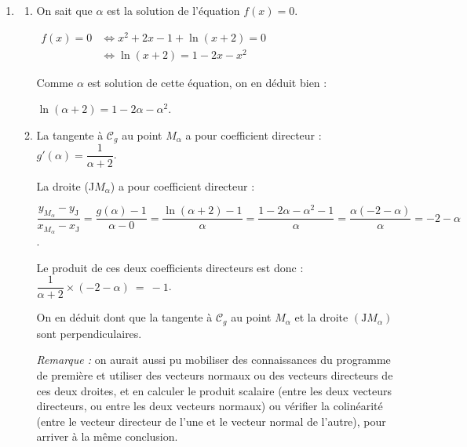\begin{enumerate}
\item \begin{enumerate}
	\item On sait que $\alpha$ est la solution de l'équation $f(x) = 0$.

	$\begin{aligned} f(x) = 0 &\iff x^2 + 2x - 1 + \ln(x+2) = 0\\
	&\iff \ln(x+2) = 1 - 2x -x^2 \end{aligned}$

	Comme $\alpha$ est solution de cette équation, on en déduit bien :

	$\ln (\alpha+2)=1-2 \alpha-\alpha^{2}$.

	\item La tangente à $\mathcal{C}_g$ au point $M_\alpha$ a pour coefficient directeur :\quad $g'(\alpha) = \dfrac{1}{\alpha + 2}$.

	La droite (J$M_\alpha$) a pour coefficient directeur :

	$\dfrac{y_{M_\alpha} - y_\mathrm{J}}{x_{M_\alpha} - x_\mathrm{J}} = \dfrac{g(\alpha) - 1}{\alpha - 0} = \dfrac{\ln(\alpha + 2)-1}{\alpha} = \dfrac{1 - 2\alpha - \alpha^2 - 1}{\alpha} = \dfrac{\alpha (-2 - \alpha)}{\alpha } = -2 - \alpha$.

	Le produit de ces deux coefficients directeurs est donc : \quad $\dfrac{1}{\alpha + 2}\times (-2-\alpha)~=~ -1$.

	On en déduit dont que la tangente à $\mathcal{C}_{g}$ au point $M_{\alpha}$ et la droite $\left(\mathrm{J}M_{\alpha}\right)$ sont perpendiculaires.

	\emph{Remarque :} on aurait aussi pu mobiliser des connaissances du programme de première et utiliser des vecteurs normaux ou des vecteurs directeurs de ces deux droites, et en calculer le produit scalaire (entre les deux vecteurs directeurs, ou entre les deux vecteurs normaux) ou vérifier la colinéarité (entre le vecteur directeur de l'une et le vecteur normal de l'autre), pour arriver à la même conclusion.
\end{enumerate}
\end{enumerate}
